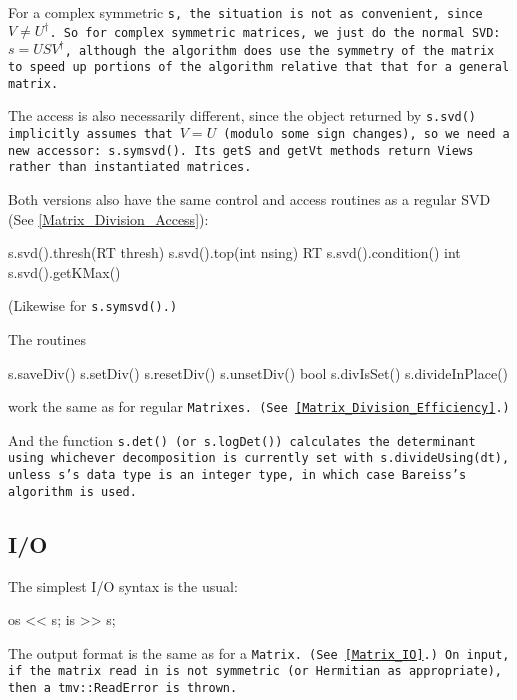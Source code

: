 \begin{enumerate}
For a complex symmetric \tt{s}, the situation is not as convenient,
since $V \neq U^\dagger$.
So for complex symmetric matrices, we
just do the normal SVD: $s = USV^\dagger$, although the algorithm
does use the symmetry of the matrix to 
speed up portions of the algorithm relative that that for a general matrix.

The access is also necessarily different, since the object returned by 
\tt{s.svd()} implicitly assumes that $V = U$ (modulo some sign changes), 
so we need a 
new accessor: \tt{s.symsvd()}.  Its \tt{getS} and \tt{getVt} methods return Views
rather than instantiated matrices.

Both versions also have the same control and access routines as a regular SVD
(See \ref{Matrix_Division_Access}):
\begin{tmvcode}
s.svd().thresh(RT thresh)
s.svd().top(int nsing)
RT s.svd().condition()
int s.svd().getKMax()
\end{tmvcode}
(Likewise for \tt{s.symsvd()}.)

\end{enumerate}
The routines 
\begin{tmvcode}
s.saveDiv()
s.setDiv()
s.resetDiv()
s.unsetDiv()
bool s.divIsSet()
s.divideInPlace()
\end{tmvcode}
work the same as for regular \tt{Matrix}es.
(See \ref{Matrix_Division_Efficiency}.)

And the function \tt{s.det()} (or \tt{s.logDet()}) calculates the determinant
using whichever decomposition is currently set with \tt{s.divideUsing(dt)},
unless \tt{s}'s data type is an integer type, in which case Bareiss's algorithm 
is used.

\subsection{I/O}
\label{SymMatrix_IO}

The simplest I/O syntax is the usual:
\begin{tmvcode}
os << s;
is >> s;
\end{tmvcode}
The output format is the same as for a \tt{Matrix}.
(See \ref{Matrix_IO}.)  On input, if the matrix read in is not symmetric (or Hermitian as appropriate), then a \tt{tmv::ReadError} is thrown.  

